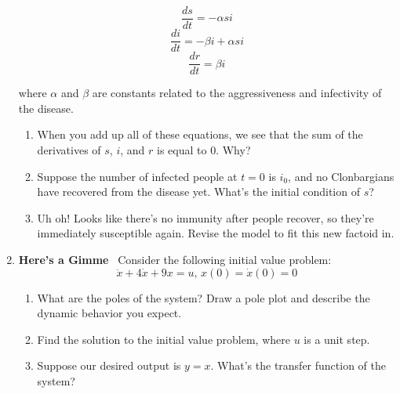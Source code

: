 \documentclass{report}
\begin{document}
\begin{onehalfspacing}
\begin{flushleft}
\begin{enumerate}
    \[\frac{ds}{dt} = -\alpha si\]
    \[\frac{di}{dt} = -\beta i + \alpha si\]
    \[\frac{dr}{dt} = \beta i\]

    where \(\alpha\) and \(\beta\) are constants related to the aggressiveness and infectivity of the disease.

    \begin{enumerate}
        \item When you add up all of these equations, we see that the sum of the derivatives of \(s\), \(i\), and \(r\) is equal to 0. Why?
        \item Suppose the number of infected people at \(t=0\) is \(i_0\), and no Clonbargians have recovered from the disease yet. What's the initial condition of \(s\)?
        \item Uh oh! Looks like there's no immunity after people recover, so they're immediately susceptible again. Revise the model to fit this new factoid in.
    \end{enumerate}
    \item \textbf{Here's a Gimme} \, Consider the following initial value problem:
    \vspace{-0.1in}
    \[\ddot{x} + 4 \dot{x} + 9 x = u, \, x(0) = \dot{x}(0) = 0\]
    \begin{enumerate}
        \item What are the poles of the system? Draw a pole plot and describe the dynamic behavior you expect.
        \item Find the solution to the initial value problem, where \(u\) is a unit step.
        \item Suppose our desired output is \(y=x\). What's the transfer function of the system?
    \end{enumerate}
\end{enumerate}

\end{flushleft}
\end{onehalfspacing}
\end{document}
